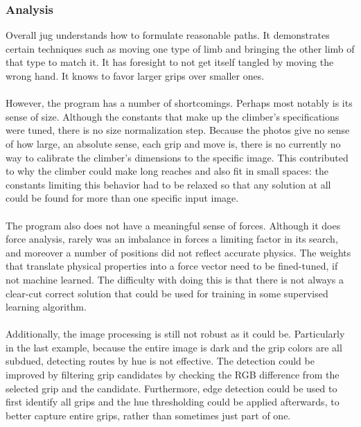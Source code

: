 \documentclass[pdftex,12pt]{article}
\theoremstyle{definition}
\theoremstyle{remark}
\begin{document}
\subsubsection*{Analysis}
Overall jug understands how to formulate reasonable paths. It demonstrates certain techniques such as moving one type of limb and bringing the other limb of that type to match it. It has foresight to not get itself tangled by moving the wrong hand. It knows to favor larger grips over smaller ones.\\ \\
However, the program has a number of shortcomings. Perhaps most notably is its sense of size. Although the constants that make up the climber's specifications were tuned, there is no size normalization step. Because the photos give no sense of how large, an absolute sense, each grip and move is, there is no currently no way to calibrate the climber's dimensions to the specific image. This contributed to why the climber could make long reaches and also fit in small spaces: the constants limiting this behavior had to be relaxed so that any solution at all could be found for more than one specific input image.\\ \\
The program also does not have a meaningful sense of forces. Although it does force analysis, rarely was an imbalance in forces a limiting factor in its search, and moreover a number of positions did not reflect accurate physics. The weights that translate physical properties into a force vector need to be fined-tuned, if not machine learned. The difficulty with doing this is that there is not always a clear-cut correct solution that could be used for training in some supervised learning algorithm. \\ \\
Additionally, the image processing is still not robust as it could be. Particularly in the last example, because the entire image is dark and the grip colors are all subdued, detecting routes by hue is not effective. The detection could be improved by filtering grip candidates by checking the RGB difference from the selected grip and the candidate. Furthermore, edge detection could be used to first identify all grips and the hue thresholding could be applied afterwards, to better capture entire grips, rather than sometimes just part of one.
\end{document}
